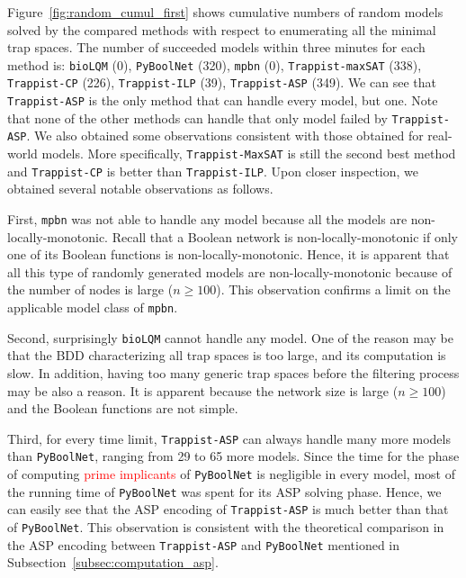 \documentclass[preprint,12pt]{elsarticle}
\newcommand{\change}[1]{\textcolor{red}{#1}}
\begin{document}
Figure~\ref{fig:random_cumul_first} shows cumulative numbers of random models solved by the compared methods with respect to enumerating all the minimal trap spaces.
The number of succeeded models within three minutes for each method is: \texttt{bioLQM} (0), \texttt{PyBoolNet} (320), \texttt{mpbn} (0), \texttt{Trappist-maxSAT} (338), \texttt{Trappist-CP} (226), \texttt{Trappist-ILP} (39), \texttt{Trappist-ASP} (349).
We can see that \texttt{Trappist-ASP} is the only method that can handle every model, but one.
Note that none of the other methods can handle that only model failed by \texttt{Trappist-ASP}.
We also obtained some observations consistent with those obtained for real-world models.
More specifically, \texttt{Trappist-MaxSAT} is still the second best method and \texttt{Trappist-CP} is better than \texttt{Trappist-ILP}.
Upon closer inspection, we obtained several notable observations as follows.

First, \texttt{mpbn} was not able to handle any model because all the models are non-locally-monotonic.
Recall that a Boolean network is non-locally-monotonic if only one of its Boolean functions is non-locally-monotonic.
Hence, it is apparent that all this type of randomly generated models are non-locally-monotonic because of the number of nodes is large (\(n \geq 100\)).
This observation confirms a limit on the applicable model class of \texttt{mpbn}.

Second, surprisingly \texttt{bioLQM} cannot handle any model.
One of the reason may be that the BDD characterizing all trap spaces is too large, and its computation is slow.
In addition, having too many generic trap spaces before the filtering process may be also a reason.
It is apparent because the network size is large (\(n \geq 100\)) and the Boolean functions are not simple.

Third, for every time limit, \texttt{Trappist-ASP} can always handle many more models than \texttt{PyBoolNet}, ranging from 29 to 65 more models.
Since the time for the phase of computing \change{prime implicants} of \texttt{PyBoolNet} is negligible in every model, most of the running time of \texttt{PyBoolNet} was spent for its ASP solving phase.
Hence, we can easily see that the ASP encoding of \texttt{Trappist-ASP} is much better than that of \texttt{PyBoolNet}.
This observation is consistent with the theoretical comparison in the ASP encoding between \texttt{Trappist-ASP} and \texttt{PyBoolNet} mentioned in Subsection~\ref{subsec:computation_asp}.

\end{document}
